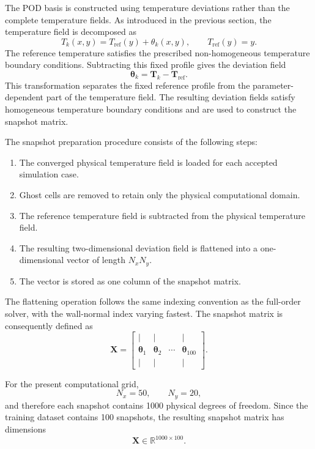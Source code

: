 The POD basis is constructed using temperature deviations rather
than the complete temperature fields. As introduced in the
previous section, the temperature field is decomposed as
\[
T_k(x,y)=T_{\mathrm{ref}}(y)+\theta_k(x,y),
\qquad
T_{\mathrm{ref}}(y)=y.
\]
The reference temperature satisfies the prescribed
non-homogeneous temperature boundary conditions. Subtracting
this fixed profile gives the deviation field
\[
\boxed{
\boldsymbol{\theta}_k
=
\mathbf{T}_k-\mathbf{T}_{\mathrm{ref}}.
}
\]
This transformation separates the fixed reference profile
from the parameter-dependent part of the temperature field.
The resulting deviation fields satisfy homogeneous temperature
boundary conditions and are used to construct the snapshot
matrix.

The snapshot preparation procedure consists of the following
steps:
\begin{enumerate}
    \item The converged physical temperature field is loaded
    for each accepted simulation case.
    \item Ghost cells are removed to retain only the physical
    computational domain.
    \item The reference temperature field is subtracted from
    the physical temperature field.
    \item The resulting two-dimensional deviation field is
    flattened into a one-dimensional vector of length
    $N_xN_y$.
    \item The vector is stored as one column of the snapshot
    matrix.
\end{enumerate}

The flattening operation follows the same indexing convention
as the full-order solver, with the wall-normal index varying
fastest. The snapshot matrix is consequently defined as
\[
\mathbf{X}
=
\begin{bmatrix}
| & | & & |\\
\boldsymbol{\theta}_1 &
\boldsymbol{\theta}_2 &
\cdots &
\boldsymbol{\theta}_{100}\\
| & | & & |
\end{bmatrix}.
\]

For the present computational grid,
\[
N_x=50,\qquad N_y=20,
\]
and therefore each snapshot contains 1000 physical degrees of
freedom. Since the training dataset contains 100 snapshots,
the resulting snapshot matrix has dimensions
\[
\boxed{
\mathbf{X}\in\mathbb{R}^{1000\times100}.
}
\]


